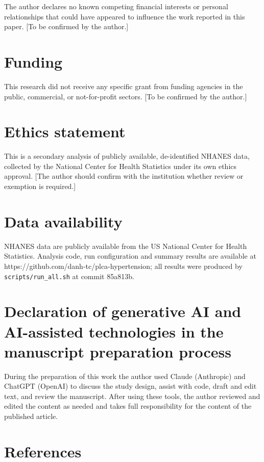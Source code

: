 \documentclass[
  11pt,
]{article}
\begin{document}
The author declares no known competing financial interests or personal
relationships that could have appeared to influence the work reported in
this paper. {[}To be confirmed by the author.{]}

\section{Funding}

This research did not receive any specific grant from funding agencies
in the public, commercial, or not-for-profit sectors. {[}To be confirmed
by the author.{]}

\section{Ethics statement}

This is a secondary analysis of publicly available, de-identified NHANES
data, collected by the National Center for Health Statistics under its
own ethics approval. {[}The author should confirm with the institution
whether review or exemption is required.{]}

\section{Data availability}

NHANES data are publicly available from the US National Center for
Health Statistics. Analysis code, run configuration and summary results
are available at https://github.com/danh-tc/plca-hypertension; all
results were produced by \texttt{scripts/run\_all.sh} at commit 85a813b.

\section{Declaration of generative AI and AI-assisted technologies in
the manuscript preparation process}

During the preparation of this work the author used Claude (Anthropic)
and ChatGPT (OpenAI) to discuss the study design, assist with code,
draft and edit text, and review the manuscript. After using these tools,
the author reviewed and edited the content as needed and takes full
responsibility for the content of the published article.

\section{References}
\end{document}
